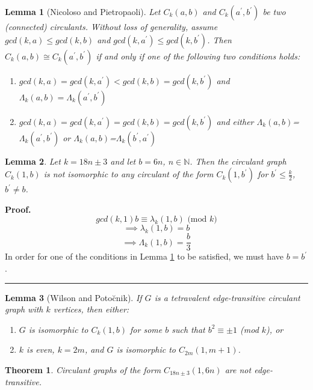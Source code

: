 \documentclass{article}%
\newtheorem{theorem}{Theorem}[section]
\newtheorem{lemma}{Lemma}[section]
\newenvironment{proof}[1][Proof]{\textbf{#1.} }{\ \rule{0.5em}{0.5em}}
\begin{document}
\begin{lemma}
[Nicoloso and Pietropaoli]\label{NP} Let $C_{k}(a,b)$ and $C_{k}(a^{\prime
},b^{\prime})$ be two (connected) circulants. Without loss of generality,
assume $gcd(k,a)\leq gcd(k,b)$ and $gcd(k,a^{\prime})\leq gcd(k,b^{\prime})$.
Then $C_{k}(a,b)\cong C_{k}(a^{\prime},b^{\prime})$ if and only if one of the
following two conditions holds:

\begin{enumerate}
\item $gcd(k,a)=gcd(k,a^{\prime}) < gcd(k,b) = gcd(k,b^{\prime})$ and
$\Lambda_{k}(a,b) = \Lambda_{k}(a^{\prime},b^{\prime})$

\item $gcd(k,a)=gcd(k,a^{\prime}) = gcd(k,b) = gcd(k,b^{\prime})$ and either
$\Lambda_{k}(a,b)$=$\Lambda_{k}(a^{\prime},b^{\prime})$ or $\Lambda_{k}%
(a,b)$=$\Lambda_{k}(b^{\prime},a^{\prime})$
\end{enumerate}
\end{lemma}

\begin{lemma}
Let $k=18n\pm3$ and let $b=6n$, $n\in\mathbb{N}$. Then the circulant graph
$C_{k}(1,b)$ is not isomorphic to any circulant of the form $C_{k}%
(1,b^{\prime})$ for $b^{\prime}\leq\frac{k}{2}$, $b^{\prime}\neq b$.
\end{lemma}

\begin{proof}%
\[
gcd(k,1)b\equiv\lambda_{k}(1,b)\mbox{ (mod  }k)
\]%
\[
\implies\lambda_{k}(1,b)=b
\]%
\[
\implies\Lambda_{k}(1,b)=\frac{b}{3}%
\]
In order for one of the conditions in Lemma \ref{NP} to be satisfied, we must
have $b=b^{\prime}$.
\end{proof}

\begin{lemma}
[Wilson and Poto\u{c}nik]If $G$ is a tetravalent edge-transitive circulant
graph with $k$ vertices, then either:

\begin{enumerate}
\item $G$ is isomorphic to $C_{k}(1,b)$ for some $b$ such that $b^{2}
\equiv\pm1$ (mod $k$), or

\item $k$ is even, $k=2m$, and $G$ is isomorphic to $C_{2m}(1,m+1)$.
\end{enumerate}
\end{lemma}

\begin{theorem}
Circulant graphs of the form $C_{18n \pm3}(1,6n)$ are \textit{not} edge-transitive.
\end{theorem}
\end{document}
